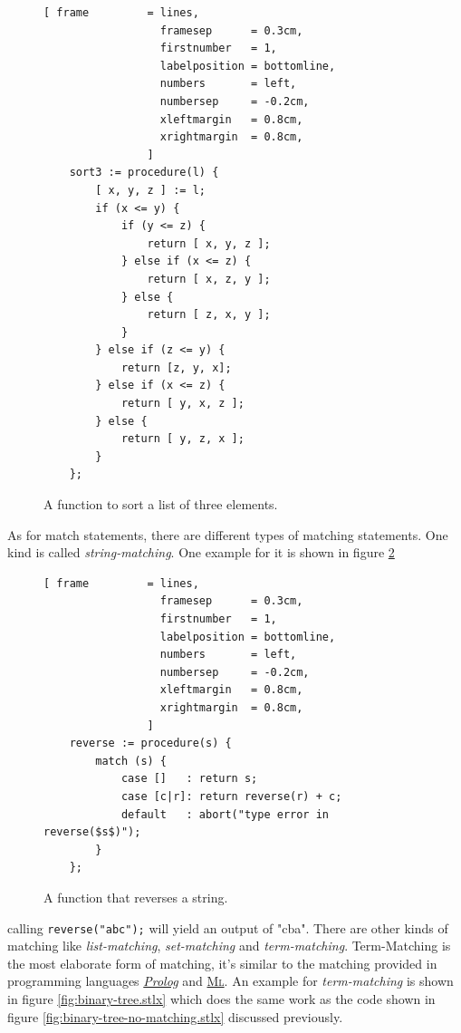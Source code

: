 \documentclass[11pt]{report}
\begin{document}
\begin{figure}[!ht]
\centering
\begin{Verbatim}[ frame         = lines, 
                  framesep      = 0.3cm, 
                  firstnumber   = 1,
                  labelposition = bottomline,
                  numbers       = left,
                  numbersep     = -0.2cm,
                  xleftmargin   = 0.8cm,
                  xrightmargin  = 0.8cm,
                ]
    sort3 := procedure(l) {
        [ x, y, z ] := l;
        if (x <= y) {
            if (y <= z) {
                return [ x, y, z ];
            } else if (x <= z) { 
                return [ x, z, y ];
            } else {
                return [ z, x, y ];
            }
        } else if (z <= y) { 
            return [z, y, x];
        } else if (x <= z) { 
            return [ y, x, z ];
        } else {
            return [ y, z, x ];
        }
    };
\end{Verbatim}
\vspace*{-0.3cm}
\caption{A function to sort a list of three elements.}
\label{fig:sort3.stlx}
\end{figure}

As for match statements, there are different types of matching statements. One kind is called \textsl{string-matching}. One example for it is shown in figure \ref{fig:reverse.stlx}

\begin{figure}[!ht]
\centering
\begin{Verbatim}[ frame         = lines, 
                  framesep      = 0.3cm, 
                  firstnumber   = 1,
                  labelposition = bottomline,
                  numbers       = left,
                  numbersep     = -0.2cm,
                  xleftmargin   = 0.8cm,
                  xrightmargin  = 0.8cm,
                ]
    reverse := procedure(s) {
        match (s) {
            case []   : return s;
            case [c|r]: return reverse(r) + c;
            default   : abort("type error in reverse($s$)");
        }
    };
\end{Verbatim}
\vspace*{-0.3cm}
\caption{A function that reverses a string.}
\label{fig:reverse.stlx}
\end{figure}
calling \texttt{reverse("abc");} will yield an output of "cba". There are other kinds of matching like \textsl{list-matching}, \textsl{set-matching} and \textsl{term-matching}. Term-Matching is the most elaborate form of matching, it's similar to the matching provided in programming languages \href{http://en.wikipedia.org/wiki/Prolog}{\textsl{Prolog}} and 
\href{http://en.wikipedia.org/wiki/ML_(programming_language)}{\textsc{Ml}}. An example for \textsl{term-matching} is shown in figure \ref{fig:binary-tree.stlx} which does the same work as the code shown in figure \ref{fig:binary-tree-no-matching.stlx} discussed previously.
\end{document}
